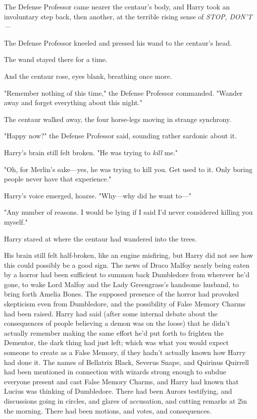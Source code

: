 The Defense Professor came nearer the centaur's body, and Harry took an
involuntary step back, then another, at the terrible rising sense of
\emph{STOP, DON'T---}

The Defense Professor kneeled and pressed his wand to the centaur's head.

The wand stayed there for a time.

And the centaur rose, eyes blank, breathing once more.

"Remember nothing of this time," the Defense Professor commanded. "Wander away
and forget everything about this night."

The centaur walked away, the four horse-legs moving in strange synchrony.

"Happy now?" the Defense Professor said, sounding rather sardonic about it.

Harry's brain still felt broken. "He was trying to \emph{kill} me."

"Oh, for Merlin's sake---yes, he was trying to kill you. Get used to it. Only
boring people never have that experience."

Harry's voice emerged, hoarse. "Why---why did he want to---"

"Any number of reasons. I would be lying if I said I'd never considered killing
you myself."

Harry stared at where the centaur had wandered into the trees.

His brain still felt half-broken, like an engine misfiring, but Harry did not
see how this could possibly be a good sign.
\sbreak
The news of Draco Malfoy nearly being eaten by a horror had been sufficient to
summon back Dumbledore from wherever he'd gone, to wake Lord Malfoy and the
Lady Greengrass's handsome husband, to bring forth Amelia Bones. The supposed
presence of the horror had provoked skepticism even from Dumbledore, and the
possibility of False Memory Charms had been raised. Harry had said (after some
internal debate about the consequences of people believing a demon was on the
loose) that he didn't actually remember making the same effort he'd put forth
to frighten the Dementor, the dark thing had just left; which was what you
would expect someone to create as a False Memory, if they hadn't actually known
how Harry had done it. The names of Bellatrix Black, Severus Snape, and
Quirinus Quirrell had been mentioned in connection with wizards strong enough
to subdue everyone present and cast False Memory Charms, and Harry had known
that Lucius was thinking of Dumbledore. There had been Aurors testifying, and
discussions going in circles, and glares of accusation, and cutting remarks at
2\AM in the morning. There had been motions, and votes, and consequences.


